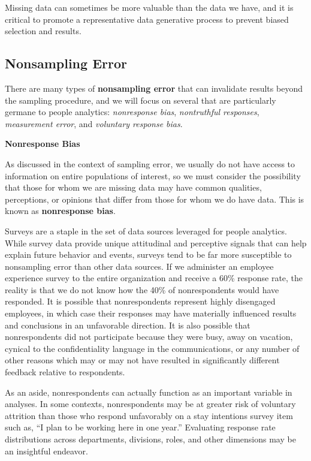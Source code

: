 \documentclass[
]{book}
\begin{document}
Missing data can sometimes be more valuable than the data we have, and it is critical to promote a representative data generative process to prevent biased selection and results.

\hypertarget{nonsampling-error}{%
\subsection{Nonsampling Error}\label{nonsampling-error}}

There are many types of \textbf{nonsampling error} that can invalidate results beyond the sampling procedure, and we will focus on several that are particularly germane to people analytics: \emph{nonresponse bias}, \emph{nontruthful responses}, \emph{measurement error}, and \emph{voluntary response bias}.

\textbf{Nonresponse Bias}

As discussed in the context of sampling error, we usually do not have access to information on entire populations of interest, so we must consider the possibility that those for whom we are missing data may have common qualities, perceptions, or opinions that differ from those for whom we do have data. This is known as \textbf{nonresponse bias}.

Surveys are a staple in the set of data sources leveraged for people analytics. While survey data provide unique attitudinal and perceptive signals that can help explain future behavior and events, surveys tend to be far more susceptible to nonsampling error than other data sources. If we administer an employee experience survey to the entire organization and receive a 60\% response rate, the reality is that we do not know how the 40\% of nonrespondents would have responded. It is possible that nonrespondents represent highly disengaged employees, in which case their responses may have materially influenced results and conclusions in an unfavorable direction. It is also possible that nonrespondents did not participate because they were busy, away on vacation, cynical to the confidentiality language in the communications, or any number of other reasons which may or may not have resulted in significantly different feedback relative to respondents.

As an aside, nonrespondents can actually function as an important variable in analyses. In some contexts, nonrespondents may be at greater risk of voluntary attrition than those who respond unfavorably on a stay intentions survey item such as, ``I plan to be working here in one year.'' Evaluating response rate distributions across departments, divisions, roles, and other dimensions may be an insightful endeavor.
\end{document}
